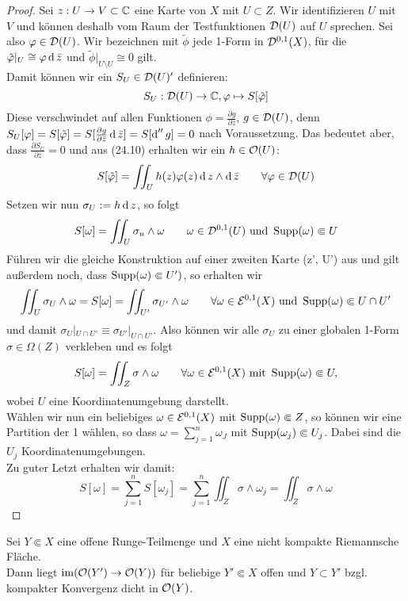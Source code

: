 \begin{proof}
  Sei $z: U \rightarrow V \subset \mathbb{C}$ eine Karte von $X$ mit $U \subset
  Z$. Wir identifizieren $U$ mit $V$ und können deshalb vom Raum der
  Testfunktionen $\mathcal{D}(U)$ auf $U$ sprechen. Sei also $\varphi \in
  \mathcal{D}(U)$. Wir bezeichnen mit $\tilde \phi$ jede 1-Form in
  $\mathcal{D}^{0,1}(X)$, für die $\tilde \phi|_U \cong \phi \d[\bar z]$ und
  $\tilde \phi |_{U \setminus U} \cong 0$ gilt. \\
  Damit können wir ein $S_U \in \mathcal{D}(U)'$ definieren:
  \[
  S_U: \mathcal{D}(U) \rightarrow \mathbb{C}, \varphi \mapsto S[\tilde {\varphi}]
  \]
  Diese verschwindet auf allen Funktionen $\phi = \frac{\partial
    g}{\partial \bar z}$, $g \in \mathcal{D}(U)$, denn $S_U[\phi] = S[\tilde
  \phi] = S[ \frac{\partial g}{\partial \bar z} \d[\bar z]] =
  S[\d[''g]] = 0$ nach Voraussetzung. Das bedeutet aber, dass
  $\frac{\partial S_U}{\partial \bar z} = 0$ und aus (24.10) erhalten
  wir ein $h \in \mathcal{O}(U)$:
  \[
  S[\tilde \phi] = \iint_U h(z) \phi(z) \d[z] \wedge \d[\bar z] \qquad
  \forall \phi \in \dist(U)
  \]
  Setzen wir nun $\sigma_U := h \d[z]$, so folgt
  \[
  S[\omega] = \iint_U \sigma_u \wedge \omega \qquad \omega \in
  \mathcal{D}^{0,1}(U) \text{ und } \operatorname{Supp}(\omega) \Subset U
  \]
  Führen wir die gleiche Konstruktion auf einer zweiten Karte (z', U')
  aus und gilt außerdem noch, dass $\operatorname{Supp}(\omega) \Subset U')$, so
  erhalten wir
  \[
  \iint_U \sigma_U \wedge \omega = S[\omega] = \iint_{U'} \sigma_{U'}
  \wedge \omega \qquad \forall \omega \in \mathcal{E}^{0,1}(X) \text{ und }
  \operatorname{Supp}(\omega) \Subset U \cap U'
  \]
  und damit $\sigma_U|_{U \cap U'} \equiv \sigma_{U'}|_{U \cap
    U'}$. Also können wir alle $\sigma_U$ zu einer globalen 1-Form
  $\sigma \in \Omega(Z)$ verkleben und es folgt
  \[
  S[\omega] = \iint_Z \sigma \wedge \omega \qquad \forall \omega \in
  \mathcal{E}^{0,1}(X) \text{ mit } \operatorname{Supp}(\omega) \Subset U,
  \]
  wobei $U$ eine Koordinatenumgebung darstellt. \\
  Wählen wir nun ein beliebiges $\omega \in \mathcal{E}^{0,1}(X)$ mit
  $\operatorname{Supp}(\omega) \Subset Z$, so können wir eine Partition der 1
  wählen, so dass $\omega = \sum_{j=1}^n \omega_J$ mit
  $\operatorname{Supp}(\omega_j) \Subset U_j$. Dabei sind die $U_j$
  Koordinatenumgebungen. \\
  Zu guter Letzt erhalten wir damit:
  \[
  S[\omega] = \sum_{j=1}^n S[\omega_j] = \sum_{j=1}^n \iint_Z \sigma
  \wedge \omega_j = \iint_Z \sigma \wedge \omega
  \]
\end{proof}

\begin{thm}
  \label{thm:runge-dicht}
  Sei $Y \Subset X$ eine offene Runge-Teilmenge und $X$ eine nicht
  kompakte Riemannsche Fläche. \\
  Dann liegt $\operatorname{im}( \mathcal{O}(Y') \rightarrow \mathcal{O}(Y))$ für beliebige $Y' \Subset X$
  offen und $Y \subset Y'$ bzgl. kompakter Konvergenz dicht in $\mathcal{O}(Y)$.
\end{thm}

